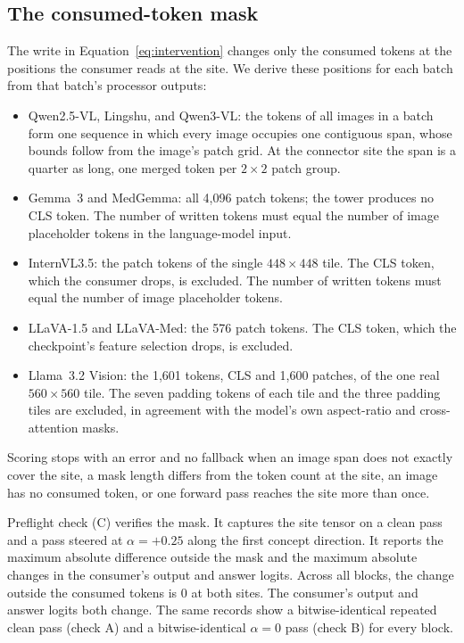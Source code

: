 \subsection{The consumed-token mask}
\label{app:repro-mask}

The write in Equation~\ref{eq:intervention} changes only the consumed tokens at the positions the consumer reads at the site. We derive these positions for each batch from that batch's processor outputs:

\begin{itemize}[leftmargin=*,itemsep=1pt,topsep=2pt]
\item Qwen2.5-VL, Lingshu, and Qwen3-VL: the tokens of all images in a batch form one sequence in which every image occupies one contiguous span, whose bounds follow from the image's patch grid. At the connector site the span is a quarter as long, one merged token per $2\times2$ patch group.
\item Gemma~3 and MedGemma: all 4{,}096 patch tokens; the tower produces no CLS token. The number of written tokens must equal the number of image placeholder tokens in the language-model input.
\item InternVL3.5: the patch tokens of the single $448\times448$ tile. The CLS token, which the consumer drops, is excluded. The number of written tokens must equal the number of image placeholder tokens.
\item LLaVA-1.5 and LLaVA-Med: the 576 patch tokens. The CLS token, which the checkpoint's feature selection drops, is excluded.
\item Llama~3.2 Vision: the 1{,}601 tokens, CLS and 1{,}600 patches, of the one real $560\times560$ tile. The seven padding tokens of each tile and the three padding tiles are excluded, in agreement with the model's own aspect-ratio and cross-attention masks.
\end{itemize}

Scoring stops with an error and no fallback when an image span does not exactly cover the site, a mask length differs from the token count at the site, an image has no consumed token, or one forward pass reaches the site more than once.

Preflight check (C) verifies the mask. It captures the site tensor on a clean pass and a pass steered at $\alpha=+0.25$ along the first concept direction. It reports the maximum absolute difference outside the mask and the maximum absolute changes in the consumer's output and answer logits. Across all \cfBlocks{} blocks, the change outside the consumed tokens is $0$ at both sites. The consumer's output and answer logits both change. The same records show a bitwise-identical repeated clean pass (check A) and a bitwise-identical $\alpha=0$ pass (check B) for every block.


